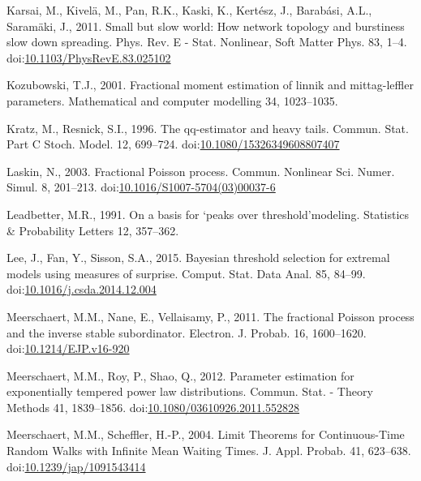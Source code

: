 \documentclass[]{elsarticle} %
\begin{document}
\leavevmode\hypertarget{ref-Karsai2011}{}%
Karsai, M., Kivelä, M., Pan, R.K., Kaski, K., Kertész, J., Barabási,
A.L., Saramäki, J., 2011. Small but slow world: How network topology and
burstiness slow down spreading. Phys. Rev. E - Stat. Nonlinear, Soft
Matter Phys. 83, 1--4.
doi:\href{https://doi.org/10.1103/PhysRevE.83.025102}{10.1103/PhysRevE.83.025102}

\leavevmode\hypertarget{ref-kozubowski2001}{}%
Kozubowski, T.J., 2001. Fractional moment estimation of linnik and
mittag-leffler parameters. Mathematical and computer modelling 34,
1023--1035.

\leavevmode\hypertarget{ref-Kratz96}{}%
Kratz, M., Resnick, S.I., 1996. The qq-estimator and heavy tails.
Commun. Stat. Part C Stoch. Model. 12, 699--724.
doi:\href{https://doi.org/10.1080/15326349608807407}{10.1080/15326349608807407}

\leavevmode\hypertarget{ref-Laskin2003}{}%
Laskin, N., 2003. Fractional Poisson process. Commun. Nonlinear Sci.
Numer. Simul. 8, 201--213.
doi:\href{https://doi.org/10.1016/S1007-5704(03)00037-6}{10.1016/S1007-5704(03)00037-6}

\leavevmode\hypertarget{ref-leadbetter1991basis}{}%
Leadbetter, M.R., 1991. On a basis for `peaks over threshold'modeling.
Statistics \& Probability Letters 12, 357--362.

\leavevmode\hypertarget{ref-Lee15}{}%
Lee, J., Fan, Y., Sisson, S.A., 2015. Bayesian threshold selection for
extremal models using measures of surprise. Comput. Stat. Data Anal. 85,
84--99.
doi:\href{https://doi.org/10.1016/j.csda.2014.12.004}{10.1016/j.csda.2014.12.004}

\leavevmode\hypertarget{ref-Meerschaert2010b}{}%
Meerschaert, M.M., Nane, E., Vellaisamy, P., 2011. The fractional
Poisson process and the inverse stable subordinator. Electron. J.
Probab. 16, 1600--1620.
doi:\href{https://doi.org/10.1214/EJP.v16-920}{10.1214/EJP.v16-920}

\leavevmode\hypertarget{ref-MeerschaertRoyQin}{}%
Meerschaert, M.M., Roy, P., Shao, Q., 2012. Parameter estimation for
exponentially tempered power law distributions. Commun. Stat. - Theory
Methods 41, 1839--1856.
doi:\href{https://doi.org/10.1080/03610926.2011.552828}{10.1080/03610926.2011.552828}

\leavevmode\hypertarget{ref-limitCTRW}{}%
Meerschaert, M.M., Scheffler, H.-P., 2004. Limit Theorems for
Continuous-Time Random Walks with Infinite Mean Waiting Times. J. Appl.
Probab. 41, 623--638.
doi:\href{https://doi.org/10.1239/jap/1091543414}{10.1239/jap/1091543414}
\end{document}
